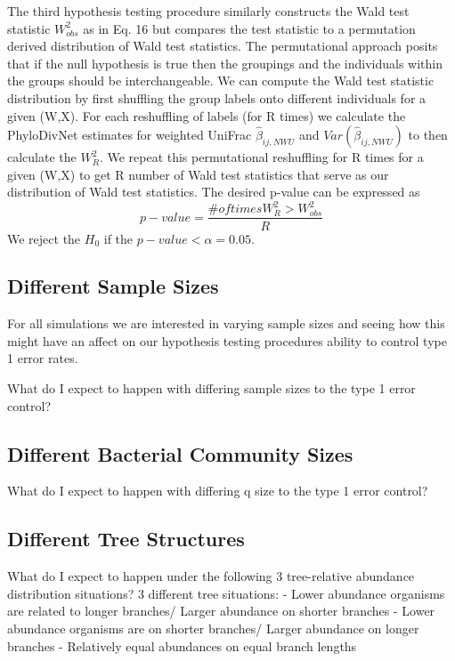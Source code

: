 \documentclass{article}
\begin{document}
The third hypothesis testing procedure similarly constructs the Wald test statistic $W_{obs}^{2}$  as in Eq. 16 but compares the test statistic to a permutation derived distribution of Wald test statistics. The permutational approach posits that if the null hypothesis is true then the groupings and the individuals within the groups should be interchangeable. We can compute the Wald test statistic distribution by first shuffling the group labels onto different individuals for a given (W,X). For each reshuffling of labels (for R times) we calculate the PhyloDivNet estimates for weighted UniFrac $\hat{\beta}_{ij,NWU}$ and $Var(\hat{\beta}_{ij,NWU})$ to then calculate the $W_{R}^2$. We repeat this permutational reshuffling for R times for a given (W,X) to get R number of Wald test statistics that serve as our distribution of Wald test statistics. The desired p-value can be expressed as
\begin{equation}
  p-value = \frac{\# of times W_{R}^2 > W_{obs}^{2}}{R}
\end{equation}
We reject the $H_0$ if the $p-value < \alpha = 0.05$.

\subsection{Different Sample Sizes}
For all simulations we are interested in varying sample sizes and seeing how this might have an affect on our hypothesis testing procedures ability to control type 1 error rates.

What do I expect to happen with differing sample sizes to the type 1 error control?


\subsection{Different Bacterial Community Sizes}
What do I expect to happen with differing q size to the type 1 error control?

\subsection{Different Tree Structures}
What do I expect to happen under the following 3 tree-relative abundance distribution situations?
3 different tree situations:
- Lower abundance organisms are related to longer branches/ Larger abundance on shorter branches
- Lower abundance organisms are on shorter branches/ Larger abundance on longer branches
- Relatively equal abundances on equal branch lengths
\end{document}
